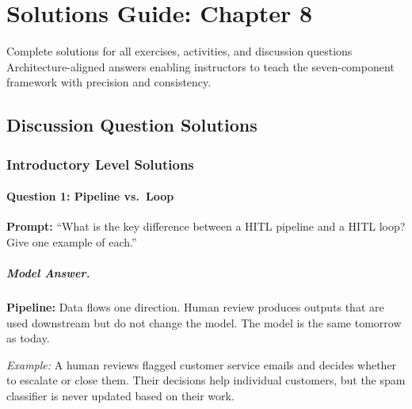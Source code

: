 
\chapter{Solutions Guide: Chapter 8}
\label{ch:solutions-ch08}

\begin{chapterquote}{Complete solutions for all exercises, activities, and discussion questions}
Architecture-aligned answers enabling instructors to teach the seven-component framework with precision and consistency.
\end{chapterquote}

\section{Discussion Question Solutions}

\subsection{Introductory Level Solutions}

\subsubsection{Question 1: Pipeline vs.\ Loop}

\textbf{Prompt:} ``What is the key difference between a HITL pipeline and a HITL loop? Give one example of each.''

\paragraph{Model Answer.}

\textbf{Pipeline:} Data flows one direction. Human review produces outputs that are used downstream but do not change the model. The model is the same tomorrow as today.

\emph{Example:} A human reviews flagged customer service emails and decides whether to escalate or close them. Their decisions help individual customers, but the spam classifier is never updated based on their work.

